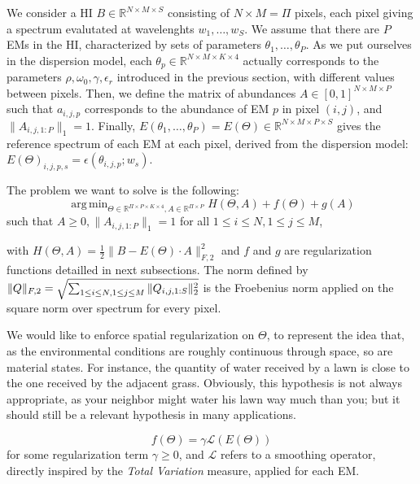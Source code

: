 \documentclass[conference]{IEEEtran}
\DeclareMathOperator*{\argmin}{arg\,min}
\begin{document}
We consider a HI $B \in \mathbb{R}^{N \times M \times S}$ consisting of $N \times M = \Pi$ pixels, each pixel giving a spectrum evalutated at wavelenghts $w_1,\dots, w_S$. We assume that there are $P$ EMs in the HI, characterized by sets of parameters $\theta_1,\dots, \theta_P$. As we put ourselves in the dispersion model, each $\theta_p \in \mathbb{R}^{N \times M \times K \times 4}$ actually corresponds to the parameters $\rho, \omega_0, \gamma, \epsilon_r$ introduced in the previous section, with different values between pixels. Then, we define the matrix of abundances $A \in [0, 1]^{N \times M\times P}$ such that $a_{i, j, p}$ corresponds to the abundance of EM $p$ in pixel $(i, j)$, and $\|A_{i, j, 1:P}\|_1 = 1$. Finally, $E(\theta_1,\dots, \theta_P) = E(\Theta) \in \mathbb{R}^{N \times M \times P \times S}$ gives the reference spectrum of each EM at each pixel, derived from the dispersion model: $E(\Theta)_{i, j, p, s} = \epsilon(\theta_{i, j, p}; w_s)$.

The problem we want to solve is the following:
\begin{equation}
  \label{eq:gen}
  \argmin_{\Theta \in \mathbb{R}^{\Pi \times P \times K \times 4}, A \in \mathbb{R}^{\Pi \times P}} H(\Theta, A) + f(\Theta) + g(A)
\end{equation}
such that $A \geq 0, \|A_{i, j, 1:P}\|_1 = 1$ for all $1\leq i \leq N, 1\leq j \leq M$, 

with $H(\Theta, A) = \frac{1}{2} \|B - E(\Theta) \cdot A\|_{F, 2}^2$ and $f$ and $g$ are regularization functions detailled in next subsections. The norm defined by $\|Q\|_{F, 2} = \sqrt{\sum_{1 \leq i \leq N,\\1 \leq j \leq M} \|Q_{i, j, 1:S}\|_2^2}$ is the Froebenius norm applied on the square norm over spectrum for every pixel.

We would like to enforce spatial regularization on $\Theta$, to represent the idea that, as the environmental conditions are roughly continuous through space, so are material states. For instance, the quantity of water received by a lawn is close to the one received by the adjacent grass. Obviously, this hypothesis is not always appropriate, as your neighbor might water his lawn way much than you; but it should still be a relevant hypothesis in many applications.

$$f(\Theta) = \gamma \mathcal{L}(E(\Theta))$$ for some regularization term $\gamma \geq 0$, and $\mathcal{L}$ refers to a smoothing operator, directly inspired by the \emph{Total Variation} measure, applied for each EM.
\end{document}
